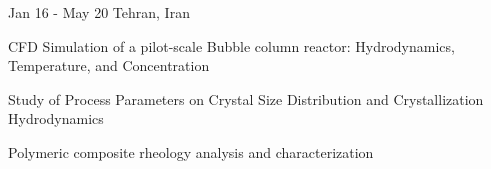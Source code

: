 \begin{cventries}
        {Jan 16 - May 20} %
        {Tehran, Iran} %
        {
            \begin{cvitemsfree} %
                \item{CFD Simulation of a pilot-scale Bubble column reactor: Hydrodynamics, Temperature, and Concentration}
                \item{Study of Process Parameters on Crystal Size Distribution and Crystallization Hydrodynamics}
                \item{Polymeric composite rheology analysis and characterization}
            \end{cvitemsfree}
        }
\end{cventries}